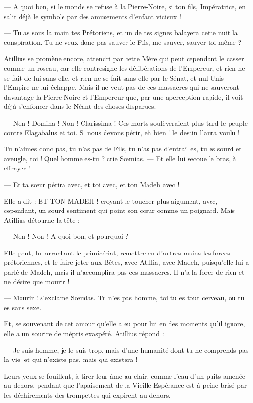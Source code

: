 \documentclass[a4paper, 11pt, oneside, polutonikogreek, french]{article}
\begin{document}
--- A quoi bon, si le monde se refuse à la Pierre-Noire, si ton fils, Impératrice, en salit déjà le symbole par des amusements d'enfant vicieux !

--- Tu as sous la main tes Prétoriens, et un de tes signes balayera cette nuit la conspiration. Tu ne veux donc pas sauver le Fils, me sauver, sauver toi-même ?

Atillius se promène encore, attendri par cette Mère qui peut cependant le casser comme un roseau, car elle contresigne les délibérations de l'Empereur, et rien ne se fait de lui sans elle, et rien ne se fait sans elle par le Sénat, et nul Unis l'Empire ne lui échappe. Mais il ne veut pas de ces massacres qui ne sauveront davantage la Pierre-Noire et l'Empereur que, par une aperception rapide, il voit déjà s'enfoncer dans le Néant des choses disparues.

--- Non ! Domina ! Non ! Clarissima ! Ces morts soulèveraient plus tard le peuple contre Elagabalus et toi. Si nous devons périr, eh bien ! le destin l'aura voulu !

Tu n'aimes donc pas, tu n'as pas de Fils, tu n'as pas d'entrailles, tu es sourd et aveugle, toi ! Quel homme es-tu ? crie Sœmias. --- Et elle lui secoue le bras, à effrayer !

--- Et ta sœur périra avec, et toi avec, et ton Madeh avec !

Elle a dit : ET TON MADEH ! croyant le toucher plus aigument, avec, cependant, un sourd sentiment qui point son cœur comme un poignard. Mais Atillius détourne la tête :

--- Non ! Non ! A quoi bon, et pourquoi ?

Elle peut, lui arrachant le primicériat, remettre en d'autres mains les forces prétoriennes, et le faire jeter aux Bêtes, avec Atillia, avec Madeh, puisqu'elle lui a parlé de Madeh, mais il n'accomplira pas ces massacres. Il n'a la force de rien et ne désire que mourir !

--- Mourir ! s'exclame Sœmias. Tu n'es pas homme, toi tu es tout cerveau, ou tu es sans sexe.

Et, se souvenant de cet amour qu'elle a eu pour lui en des moments qu'il ignore, elle a un sourire de mépris exaspéré. Atillius répond :

--- Je suis homme, je le suis trop, mais d'une humanité dont tu ne comprends pas la vie, et qui n'existe pas, mais qui existera !

Leurs yeux se fouillent, à tirer leur âme au clair, comme l'eau d'un puits amenée au dehors, pendant que l'apaisement de la Vieille-Espérance est à peine brisé par les déchirements des trompettes qui expirent au dehors.
\end{document}
